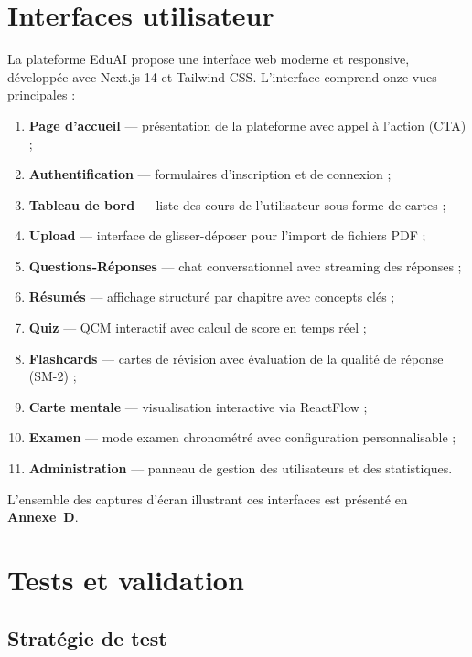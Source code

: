 \section{Interfaces utilisateur}

La plateforme EduAI propose une interface web moderne et responsive, développée avec Next.js 14 et Tailwind CSS. L'interface comprend onze vues principales :

\begin{enumerate}
  \item \textbf{Page d'accueil} — présentation de la plateforme avec appel à l'action (CTA) ;
  \item \textbf{Authentification} — formulaires d'inscription et de connexion ;
  \item \textbf{Tableau de bord} — liste des cours de l'utilisateur sous forme de cartes ;
  \item \textbf{Upload} — interface de glisser-déposer pour l'import de fichiers PDF ;
  \item \textbf{Questions-Réponses} — chat conversationnel avec streaming des réponses ;
  \item \textbf{Résumés} — affichage structuré par chapitre avec concepts clés ;
  \item \textbf{Quiz} — QCM interactif avec calcul de score en temps réel ;
  \item \textbf{Flashcards} — cartes de révision avec évaluation de la qualité de réponse (SM-2) ;
  \item \textbf{Carte mentale} — visualisation interactive via ReactFlow ;
  \item \textbf{Examen} — mode examen chronométré avec configuration personnalisable ;
  \item \textbf{Administration} — panneau de gestion des utilisateurs et des statistiques.
\end{enumerate}

L'ensemble des captures d'écran illustrant ces interfaces est présenté en \textbf{Annexe~D}.

\section{Tests et validation}

\subsection{Stratégie de test}

